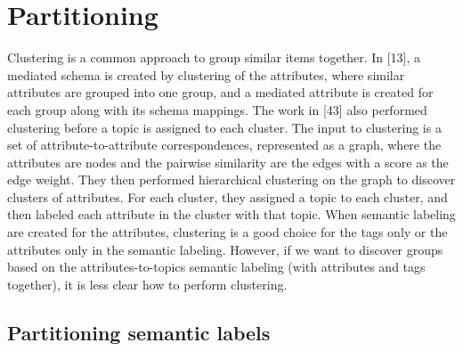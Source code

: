 \section{Partitioning}
\label{sec:Partitioning}

Clustering is a common approach to group similar items together. In \cite{ilprints851}[13], a mediated schema is created by clustering of the attributes, where similar attributes are grouped into one group, and a mediated attribute is created for each group along with its schema mappings. The work in \cite{Smith2011Unity}[43] also performed clustering before a topic is assigned to each cluster. The input to clustering is a set of attribute-to-attribute correspondences, represented as a graph, where the attributes are nodes and the pairwise similarity are the edges with a score as the edge weight. They then performed hierarchical clustering on the graph to discover clusters of attributes. For each cluster, they assigned a topic to each cluster, and then labeled each attribute in the cluster with that topic.
When semantic labeling are created for the attributes, clustering is a good choice for the tags only or the attributes only in the semantic labeling. However, if we want to discover groups based on the attributes-to-topics semantic labeling (with attributes and tags together), it is less clear how to perform clustering.

\subsection{Partitioning semantic labels}
\label{ssec:PartitioningSemanticLabels}

